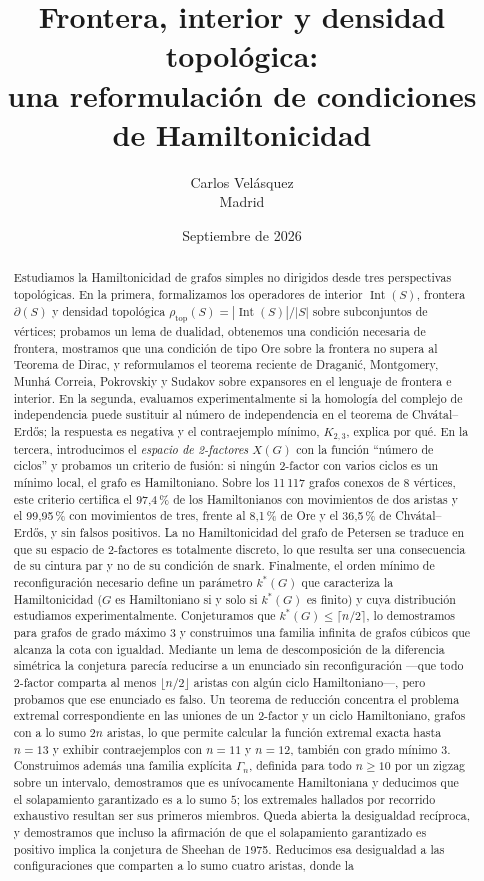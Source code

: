 \documentclass[11pt,a4paper]{article}
\title{Frontera, interior y densidad topológica:\\
una reformulación de condiciones de Hamiltonicidad}
\author{Carlos Velásquez\\ \small Madrid}
\date{Septiembre de 2026}
\theoremstyle{definition}
\theoremstyle{remark}
\newcommand{\Int}{\operatorname{Int}}
\newcommand{\rtop}{\rho_{\mathrm{top}}}
\begin{document}
\maketitle

\begin{abstract}
Estudiamos la Hamiltonicidad de grafos simples no dirigidos desde tres perspectivas topológicas. En la primera, formalizamos los operadores de interior $\Int(S)$, frontera $\partial(S)$ y densidad topológica $\rtop(S)=|\Int(S)|/|S|$ sobre subconjuntos de vértices; probamos un lema de dualidad, obtenemos una condición necesaria de frontera, mostramos que una condición de tipo Ore sobre la frontera no supera al Teorema de Dirac, y reformulamos el teorema reciente de Draganić, Montgomery, Munhá Correia, Pokrovskiy y Sudakov sobre expansores en el lenguaje de frontera e interior. En la segunda, evaluamos experimentalmente si la homología del complejo de independencia puede sustituir al número de independencia en el teorema de Chvátal--Erdős; la respuesta es negativa y el contraejemplo mínimo, $K_{2,3}$, explica por qué. En la tercera, introducimos el \emph{espacio de 2-factores} $X(G)$ con la función ``número de ciclos'' y probamos un criterio de fusión: si ningún 2-factor con varios ciclos es un mínimo local, el grafo es Hamiltoniano. Sobre los 11\,117 grafos conexos de 8 vértices, este criterio certifica el 97{,}4\,\% de los Hamiltonianos con movimientos de dos aristas y el 99{,}95\,\% con movimientos de tres, frente al 8{,}1\,\% de Ore y el 36{,}5\,\% de Chvátal--Erdős, y sin falsos positivos. La no Hamiltonicidad del grafo de Petersen se traduce en que su espacio de 2-factores es totalmente discreto, lo que resulta ser una consecuencia de su cintura par y no de su condición de snark. Finalmente, el orden mínimo de reconfiguración necesario define un parámetro $k^*(G)$ que caracteriza la Hamiltonicidad ($G$ es Hamiltoniano si y solo si $k^*(G)$ es finito) y cuya distribución estudiamos experimentalmente. Conjeturamos que $k^*(G)\le\lceil n/2\rceil$, lo demostramos para grafos de grado máximo $3$ y construimos una familia infinita de grafos cúbicos que alcanza la cota con igualdad. Mediante un lema de descomposición de la diferencia simétrica la conjetura parecía reducirse a un enunciado sin reconfiguración —que todo 2-factor comparta al menos $\lfloor n/2\rfloor$ aristas con algún ciclo Hamiltoniano—, pero probamos que ese enunciado es falso. Un teorema de reducción concentra el problema extremal correspondiente en las uniones de un 2-factor y un ciclo Hamiltoniano, grafos con a lo sumo $2n$ aristas, lo que permite calcular la función extremal exacta hasta $n=13$ y exhibir contraejemplos con $n=11$ y $n=12$, también con grado mínimo $3$. Construimos además una familia explícita $\Gamma_n$, definida para todo $n\ge10$ por un zigzag sobre un intervalo, demostramos que es unívocamente Hamiltoniana y deducimos que el solapamiento garantizado es a lo sumo $5$; los extremales hallados por recorrido exhaustivo resultan ser sus primeros miembros. Queda abierta la desigualdad recíproca, y demostramos que incluso la afirmación de que el solapamiento garantizado es positivo implica la conjetura de Sheehan de 1975. Reducimos esa desigualdad a las configuraciones que comparten a lo sumo cuatro aristas, donde la 
\end{abstract}
\end{document}
